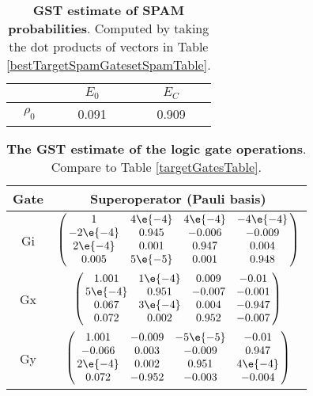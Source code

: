 {\begin{table}[h]
\begin{center}
\begin{tabular}[l]{|c|c|c|}
\hline
 & $E_{0}$ & $E_C$ \\ \hline
$\rho_{0}$ & 0.091 & 0.909 \\ \hline
\end{tabular}

\caption{\textbf{GST estimate of SPAM probabilities}.  Computed by taking the dot products of vectors in Table \ref{bestTargetSpamGatesetSpamTable}.\label{bestTargetSpamGatesetSpamParametersTable}}
\end{center}
\end{table}

\begin{table}[h]
\begin{center}
\begin{tabular}[l]{|c|c|}
\hline
Gate & Superoperator (Pauli basis) \\ \hline
Gi & $ \left(\!\!\begin{array}{cccc}
1 & 4\e{-4} & 4\e{-4} & -4\e{-4} \\ 
-2\e{-4} & 0.945 & -0.006 & -0.009 \\ 
2\e{-4} & 0.001 & 0.947 & 0.004 \\ 
0.005 & 5\e{-5} & 0.001 & 0.948
 \end{array}\!\!\right) $
 \\ \hline
Gx & $ \left(\!\!\begin{array}{cccc}
1.001 & 1\e{-4} & 0.009 & -0.01 \\ 
5\e{-4} & 0.951 & -0.007 & -0.001 \\ 
0.067 & 3\e{-4} & 0.004 & -0.947 \\ 
0.072 & 0.002 & 0.952 & -0.007
 \end{array}\!\!\right) $
 \\ \hline
Gy & $ \left(\!\!\begin{array}{cccc}
1.001 & -0.009 & -5\e{-5} & -0.01 \\ 
-0.066 & 0.003 & -0.009 & 0.947 \\ 
2\e{-4} & 0.002 & 0.951 & 4\e{-4} \\ 
0.072 & -0.952 & -0.003 & -0.004
 \end{array}\!\!\right) $
 \\ \hline
\end{tabular}

\caption{\textbf{The GST estimate of the logic gate operations}.  Compare to Table \ref{targetGatesTable}.\label{bestTargetSpamGatesetGatesTable}}
\end{center}
\end{table}

}
